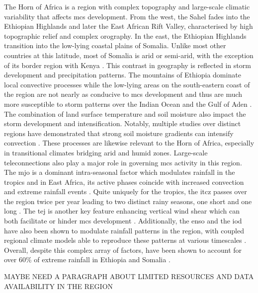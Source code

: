 The Horn of Africa is a region with complex topography and large-scale climatic variability that affects \acrshort{mcs} development. From the west, the Sahel fades into the Ethiopian Highlands and later the East African Rift Valley, characterised by high topographic relief and complex orography. In the east, the Ethiopian Highlands transition into the low-lying coastal plains of Somalia. Unlike most other countries at this latitude, most of Somalia is arid or semi-arid, with the exception of its border region with Kenya \citep{Beck2023}. This contrast in geography is reflected in storm development and precipitation patterns. The mountains of Ethiopia dominate local convective processes \citep{Negash2024} while the low-lying areas on the south-eastern coast of the region are not nearly as conducive to \acrshort{mcs} development and thus are much more susceptible to storm patterns over the Indian Ocean and the Gulf of Aden \citep{Camberlin2024}. The combination of land surface temperature and soil moisture also impact the storm development and intensification. Notably, multiple studies over distinct regions have demonstrated that strong soil moisture gradients can intensify convection \citep{Barton2021,Klein2020,Taylor2017}. These processes are likewise relevant to the Horn of Africa, especially in transitional climates bridging arid and humid zones. Large-scale \glspl{teleconnection} also play a major role in governing \acrshort{mcs} activity in this region. The \acrfull{mjo} is a dominant intra-seasonal factor which modulates rainfall in the tropics and in East Africa, its active phases coincide with increased convection and extreme rainfall events \citep{Camberlin2019,Ochieng2023,Pohl2006}. Quite uniquely for the tropics, the \acrfull{itcz} passes over the region twice per year leading to two distinct rainy seasons, one short and one long \citep{Palmer2023,Tefera2025}. The \acrfull{tej} is another key feature enhancing vertical wind shear which can both facilitate or hinder \acrshort{mcs} development \citep{Farnsworth2011,Vashisht2021}. Additionally, the \acrfull{enso} and the \acrfull{iod} have also been shown to modulate rainfall patterns in the region, with coupled regional climate models able to reproduce these patterns at various timescales \citep{Dubache2019,Endris2019,Vashisht2021}. Overall, despite this complex array of factors,  have been shown to account for over 60\% of extreme rainfall in Ethiopia and Somalia \citep{Hill2023}.

MAYBE NEED A PARAGRAPH ABOUT LIMITED RESOURCES AND DATA AVAILABILITY IN THE REGION

